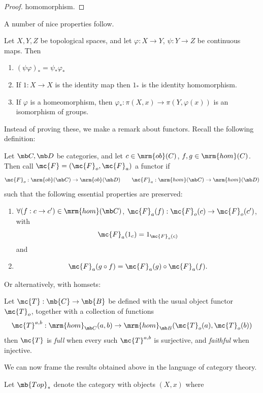 \documentclass{fkbook}
\newcommand{\ob}{\mrm{ob}}
\newcommand{\homm}{\mrm{hom}}
\begin{document}
\begin{adjustwidth}{1em}{1em}
\begin{proof}
    homomorphism.
  \end{proof}
  A number of nice properties follow.
  \begin{theorem}
    Let $X,Y,Z$ be topological spaces, and let $\varphi : X \to Y$,
    $\psi : Y \to Z$ be continuous maps. Then
    \begin{enumerate}[label=\arabic*)]
      \item $(\psi \varphi)_* = \psi_* \varphi_*$
      \item If $1 : X \to X$ is the identity map then $1_*$ is the
        identity homomorphism.
      \item If $\varphi$ is a homeomorphism, then $\varphi_* :
        \pi(X,x) \to \pi(Y, \varphi(x))$ is an isomorphism of groups.
    \end{enumerate}
  \end{theorem}
  Instead of proving these, we make a remark about functors. Recall
  the following definition:
  \begin{definition}[Functor]
    Let $\mb C, \mb D$ be categories, and let $c \in \ob(C)$, $f,g \in
    \homm(C)$. Then call $\mc{F} = (\mc{F}_o, \mc{F}_a)$ a functor if
    \[
      \mc{F}_o : \ob(\mb C) \to \ob(\mb D) \qquad \mc{F}_a : \homm(\mb
      C) \to \homm(\mb D)
    \]
    such that the following essential properties are preserved:
    \begin{enumerate}
    \item $\forall (f : c \to c') \in \homm(\mb C)$, $\mc{F}_a(f) :
      \mc{F}_o(c) \to \mc{F}_o(c')$, with
      \[
        \mc{F}_a(1_{c}) = 1_{\mc{F}_o(c)}
      \]
      and
    \item
      \[
        \mc{F}_a(g \circ f) = \mc{F}_a(g) \circ \mc{F}_a(f).
      \]
    \end{enumerate}
  \end{definition}
  Or alternatively, with homsets:
  \begin{definition}
    Let $\mc{T} : \mb{C} \to \mb{B}$ be defined with the usual object
    functor $\mc{T}_o$, together with a collection of functions
    \[
      \mc{T}^{a,b} : \homm_{\mb C}(a,b) \to \homm_{\mb B}(\mc{T}_o(a),
      \mc{T}_o(b))
    \]
    then $\mc{T}$ is \emph{full} when every such $\mc{T}^{a,b}$ is
    surjective, and \emph{faithful} when injective.
  \end{definition}
  We can now frame the results obtained above in the language of
  category theory.
  \begin{theorem}
    Let $\mb{Top}_*$ denote the category with objects $(X,x)$ where

\end{theorem}
\end{adjustwidth}
\end{document}
